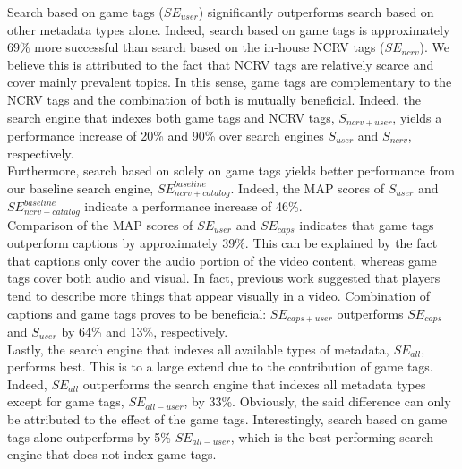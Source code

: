 Search based on game tags ($SE_{user}$) significantly outperforms search based on other metadata types alone. Indeed, search based on game tags is approximately 69\% more successful than search based on the in-house NCRV tags ($SE_{ncrv}$). We believe this is attributed to the fact that NCRV tags are relatively scarce and cover mainly prevalent topics. In this sense, game tags are complementary to the NCRV tags and the combination of both is mutually beneficial. Indeed, the search engine that indexes both game tags and NCRV tags, $S_{ncrv+user}$, yields a performance increase of 20\% and 90\% over search engines $S_{user}$ and $S_{ncrv}$, respectively.\\
Furthermore, search based on solely on game tags yields better performance from our baseline search engine, $SE_{ncrv+catalog}^{baseline}$. Indeed, the MAP scores of $S_{user}$ and $SE_{ncrv+catalog}^{baseline}$ indicate a performance increase of 46\%.\\
Comparison of the MAP scores of $SE_{user}$ and $SE_{caps}$ indicates that game tags outperform captions by approximately 39\%. This can be explained by the fact that captions only cover the audio portion of the video content, whereas game tags cover both audio and visual. In fact, previous work \cite{kcap} suggested that players tend to describe more things that appear visually in a video. Combination of captions and game tags proves to be beneficial: $SE_{caps+user}$ outperforms $SE_{caps}$ and $S_{user}$ by 64\% and 13\%, respectively.\\
Lastly, the search engine that indexes all available types of metadata, $SE_{all}$, performs best. This is to a large extend due to the contribution of game tags. Indeed, $SE_{all}$ outperforms the search engine that indexes all metadata types except for game tags, $SE_{all-user}$, by 33\%. Obviously, the said difference can only be attributed to the effect of the game tags. Interestingly, search based on game tags alone outperforms by 5\%  $SE_{all-user}$, which is the best performing search engine that does not index game tags.

